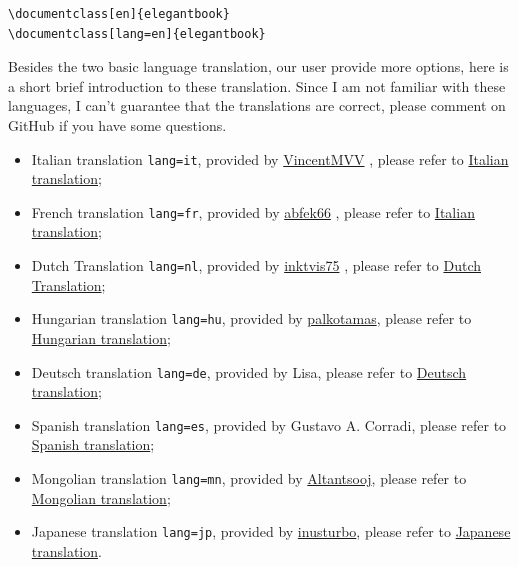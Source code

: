 \documentclass[11pt,bibend=bibtex]{elegantbook}
\begin{document}
\begin{lstlisting}
\documentclass[en]{elegantbook} 
\documentclass[lang=en]{elegantbook}
\end{lstlisting}

Besides the two basic language translation, our user provide more options, here is a short brief introduction to these translation. Since I am not familiar with these languages, I can't guarantee that the translations are correct, please comment on GitHub if you have some questions.

\begin{itemize}
  \item Italian translation \lstinline{lang=it}, provided by \href{https://github.com/VincentMVV}{VincentMVV} , please refer to \href{https://github.com/ElegantLaTeX/ElegantBook/issues/85}{Italian translation};
  \item French translation \lstinline{lang=fr}, provided by \href{https://github.com/abfek66}{abfek66} , please refer to \href{https://github.com/ElegantLaTeX/ElegantBook/issues/85}{Italian translation};
  \item Dutch Translation \lstinline{lang=nl}, provided by \href{https://github.com/inktvis75}{inktvis75} , please refer to \href{https://github.com/ElegantLaTeX/ElegantBook/issues/108}{Dutch Translation};
  \item Hungarian translation \lstinline{lang=hu}, provided by \href{https://github.com/palkotamas}{palkotamas}, please refer to \href{https://github.com/ElegantLaTeX/ElegantBook/issues/111}{Hungarian translation};
  \item Deutsch translation \lstinline{lang=de}, provided by Lisa, please refer to \href{https://github.com/ElegantLaTeX/ElegantBook/issues/113}{Deutsch translation};
  \item Spanish translation \lstinline{lang=es}, provided by Gustavo A. Corradi, please refer to \href{https://github.com/ElegantLaTeX/ElegantBook/issues/133}{Spanish translation};
  \item Mongolian translation \lstinline{lang=mn}, provided by \href{https://github.com/Altantsooj}{Altantsooj}, please refer to \href{https://github.com/ElegantLaTeX/ElegantBook/issues/137}{Mongolian translation};
  \item Japanese translation \lstinline{lang=jp}, provided by \href{https://github.com/inusturbo}{inusturbo}, please refer to \href{https://github.com/ElegantLaTeX/ElegantBook/issues/172}{Japanese translation}.
\end{itemize}
\end{document}
